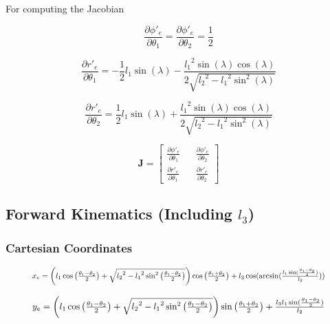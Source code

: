 \documentclass[11pt, titlepage]{article}
\begin{document}
For computing the Jacobian

\begin{equation}
	\frac{\partial \phi'_e}{\partial \theta_1} = \frac{\partial \phi'_e}{\partial \theta_2} = \frac{1}{2}
\end{equation}

\begin{equation}
	\frac{\partial r'_e}{\partial \theta_1} = {-\frac{1}{2}l_1\sin(\lambda)-\frac{{l_1}^2\sin(\lambda)\cos(\lambda)}{2\sqrt{{l_2}^2-{l_1}^2\sin^2(\lambda)}}}
\end{equation}

\begin{equation}
	\frac{\partial r'_e}{\partial \theta_2} = {\frac{1}{2}l_1\sin(\lambda)+\frac{{l_1}^2\sin(\lambda)\cos(\lambda)}{2\sqrt{{l_2}^2-{l_1}^2\sin^2(\lambda)}}}
\end{equation}

$$
	\textbf{J} = 
\begin{bmatrix}
\frac{\partial \phi'_e}{\partial \theta_1} &&
\frac{\partial \phi'_e}{\partial \theta_2} \\
\frac{\partial r'_e}{\partial \theta_1} &&
\frac{\partial r'_e}{\partial \theta_2}
\end{bmatrix}
$$


\newpage
\subsection{Forward Kinematics (Including $l_3$)}
\subsubsection{Cartesian Coordinates}
\begin{equation}
\resizebox{.9 \textwidth}{!} 
{
$x_e = \left(l_1\cos\left(\frac{\theta_1-\theta_2}{2}\right)+\sqrt{{l_2}^2-{l_1}^2\sin^2\left(\frac{\theta_1-\theta_2}{2}\right)}\right)\cos\left(\frac{\theta_1+\theta_2}{2}\right) + l_3\cos(\arcsin(\frac{l_1\sin(\frac{\theta_1-\theta_2}{2})}{l_2}))$
}
\end{equation}

\begin{equation}
\resizebox{.9 \textwidth}{!} 
{
$y_e = \left(l_1\cos\left(\frac{\theta_1-\theta_2}{2}\right)+\sqrt{{l_2}^2-{l_1}^2\sin^2\left(\frac{\theta_1-\theta_2}{2}\right)}\right)\sin\left(\frac{\theta_1+\theta_2}{2}\right) + \frac{l_3l_1\sin(\frac{\theta_1-\theta_2}{2})}{l_2}$
}
\end{equation}\newline
\end{document}

